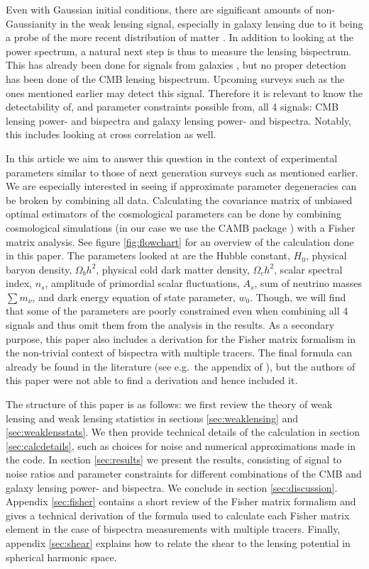 \documentclass[11pt]{article} %
\begin{document}
Even with Gaussian initial conditions, there are significant amounts of non-Gaussianity in the weak lensing signal, especially in galaxy lensing due to it being a probe of the more recent distribution of matter \cite{Bernardeau1997,Takada2003}. In addition to looking at the power spectrum, a natural next step is thus to measure the lensing bispectrum. This has already been done for signals from galaxies \cite{vanWaerbeke2002}, but no proper detection has been done of the CMB lensing bispectrum. Upcoming surveys such as the ones mentioned earlier may detect this signal. Therefore it is relevant to know the detectability of, and parameter constraints possible from, all 4 signals: CMB lensing power- and bispectra and galaxy lensing power- and bispectra. Notably, this includes looking at cross correlation as well. 

In this article we aim to answer this question in the context of experimental parameters similar to those of next generation surveys such as mentioned earlier. We are especially interested in seeing if approximate parameter degeneracies can be broken by combining all data. Calculating the covariance matrix of unbiased optimal estimators of the cosmological parameters can be done by combining cosmological simulations (in our case we use the CAMB package \cite{Lewis2000}) with a Fisher matrix analysis. See figure \ref{fig:flowchart} for an overview of the calculation done in this paper. The parameters looked at are the Hubble constant, $H_0$, physical baryon density, $\Omega_b h^2$, physical cold dark matter density, $\Omega_c h^2$, scalar spectral index, $n_s$, amplitude of primordial scalar fluctuations, $A_s$, sum of neutrino masses $\sum m_\nu$, and dark energy equation of state parameter, $w_0$. Though, we will find that some of the parameters are poorly constrained even when combining all 4 signals and thus omit them from the analysis in the results. As a secondary purpose, this paper also includes a derivation for the Fisher matrix formalism in the non-trivial context of bispectra with multiple tracers. The final formula can already be found in the literature (see e.g.\ the appendix of \cite{Kalaja_2021}), but the authors of this paper were not able to find a derivation and hence included it.

The structure of this paper is as follows: we first review the theory of weak lensing and weak lensing statistics in sections \ref{sec:weaklensing} and \ref{sec:weaklensstats}. We then provide technical details of the calculation in section \ref{sec:calcdetails}, such as choices for noise and numerical approximations made in the code. In section \ref{sec:results} we present the results, consisting of signal to noise ratios and parameter constraints for different combinations of the CMB and galaxy lensing power- and bispectra. We conclude in section \ref{sec:discussion}. Appendix \ref{sec:fisher} contains a short review of the Fisher matrix formalism and gives a technical derivation of the formula used to calculate each Fisher matrix element in the case of bispectra measurements with multiple tracers. Finally, appendix \ref{sec:shear} explains how to relate the shear to the lensing potential in spherical harmonic space.
\end{document}
